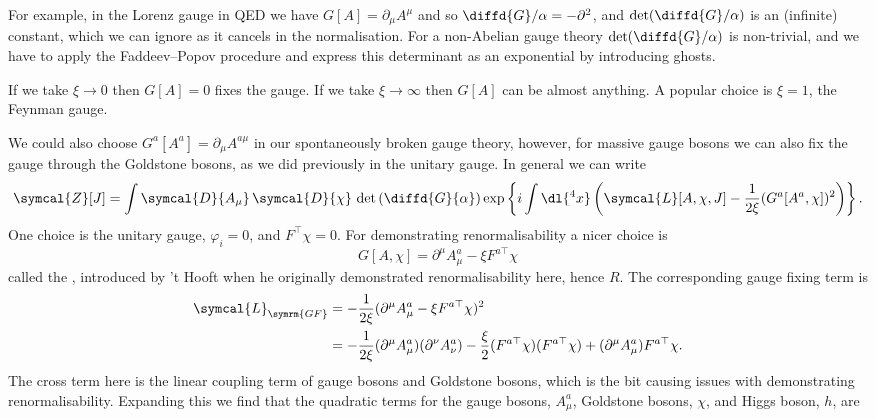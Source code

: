 \documentclass[fleqn]{NotesClass}
\newcommand{\lagrangianDensity}{\symcal{L}}
\newcommand{\DL}[1]{\symcal{D}{#1}}
\newcommand{\DD}[1]{\,\symcal{D}{#1}}
\newcommand{\dalembertian}{\partial^2}
\newcommand{\trans}{\top}
\newcommand{\partitionFunction}{\symcal{Z}}
\begin{document}
    For example, in the Lorenz gauge in QED we have \(G[A] = \partial_\mu A^\mu\) and so \(\diffd{G}/{\alpha} = -\dalembertian\), and \(\det(\diffd{G}/{\alpha})\) is an (infinite) constant, which we can ignore as it cancels in the normalisation.
    For a non-Abelian gauge theory \(\det(\diffd{G}/{\alpha})\) is non-trivial, and we have to apply the Faddeev--Popov procedure and express this determinant as an exponential by introducing ghosts.
    
    If we take \(\xi \to 0\) then \(G[A] = 0\) fixes the gauge.
    If we take \(\xi \to \infty\) then \(G[A]\) can be almost anything.
    A popular choice is \(\xi = 1\), the Feynman gauge.
    
    We could also choose \(G^a[A^a] = \partial_\mu A^{a\mu}\) in our spontaneously broken gauge theory, however, for massive gauge bosons we can also fix the gauge through the Goldstone bosons, as we did previously in the unitary gauge.
    In general we can write
    \begin{equation}
        \partitionFunction[J] = \int \DL{A_\mu} \DD{\chi}  \, \det\left( \diffd{G}{\alpha} \right) \exp\left\{ i \int \dl{^4x} \left( \lagrangianDensity[A, \chi, J] - \frac{1}{2\xi}(G^a[A^a, \chi])^2 \right) \right\}.
    \end{equation}
    One choice is the unitary gauge, \(\varphi_i = 0\),  and \(F^\trans \chi = 0\).
    For demonstrating renormalisability a nicer choice is
    \begin{equation}
        G[A, \chi] = \partial^\mu A^a_\mu - \xi F^{a\trans} \chi
    \end{equation}
    called the , introduced by 't Hooft when he originally demonstrated renormalisability here, hence \(R\).
    The corresponding gauge fixing term is
    \begin{align}
        \lagrangianDensity_{\symrm{GF}} &= -\frac{1}{2\xi} (\partial^\mu A^a_\mu - \xi F^{a\trans} \chi)^2\\
        &= -\frac{1}{2\xi} (\partial^\mu A^a_\mu)(\partial^\nu A^a_\nu) - \frac{\xi}{2}(F^{a\trans}\chi)(F^{a\trans}\chi) + (\partial^\mu A^a_\mu) F^{a\trans}\chi.
    \end{align}
    The cross term here is the linear coupling term of gauge bosons and Goldstone bosons, which is the bit causing issues with demonstrating renormalisability.
    Expanding this we find that the quadratic terms for the gauge bosons, \(A^a_\mu\), Goldstone bosons, \(\chi\), and Higgs boson, \(h\), are
\end{document}
